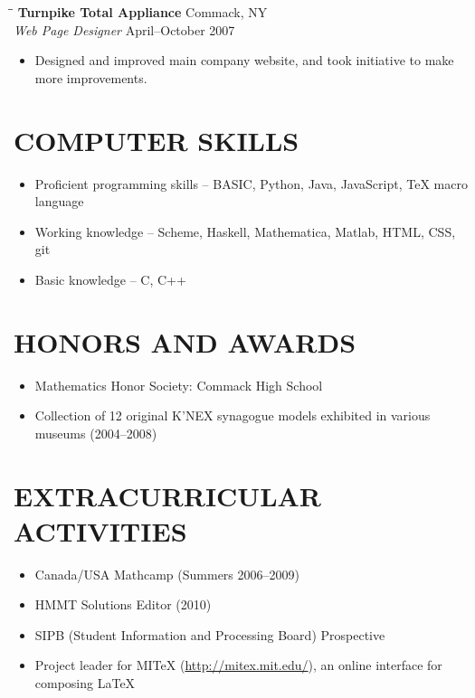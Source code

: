 \documentclass[11pt]{res}
\begin{document}
\begin{resume}
   \begin{tabbing}
   \hspace{2.3in}\= \hspace{2.6in}\= \kill %
    {\bf Turnpike Total Appliance} \>     \>Commack, NY\\
     \emph{Web Page Designer}      \>                  \>April--October 2007
   \end{tabbing}%
   \begin{itemize}
      \item Designed and improved main company website, and took initiative to make more improvements.
    \end{itemize}
          


\section{COMPUTER SKILLS}
    \begin{itemize}
      \item Proficient programming skills -- BASIC, Python, Java, JavaScript, \TeX{} macro language
      \item Working knowledge -- Scheme, Haskell, Mathematica, Matlab, HTML, CSS, git
      \item Basic knowledge -- C, C++
    \end{itemize}
 
\section{HONORS AND AWARDS}          
    \begin{itemize}
      \item Mathematics Honor Society: Commack High School
      \item Collection of 12 original K'NEX synagogue models exhibited in various museums (2004--2008)
    \end{itemize}
 
\section{EXTRACURRICULAR ACTIVITIES}
    \begin{itemize}
      \item Canada/USA Mathcamp (Summers 2006--2009)
      \item HMMT Solutions Editor (2010)
      \item SIPB (Student Information and Processing Board) Prospective
      \item Project leader for MITeX (\url{http://mitex.mit.edu/}), an online interface for composing \LaTeX
    \end{itemize}
 
\end{resume}
\end{document}
